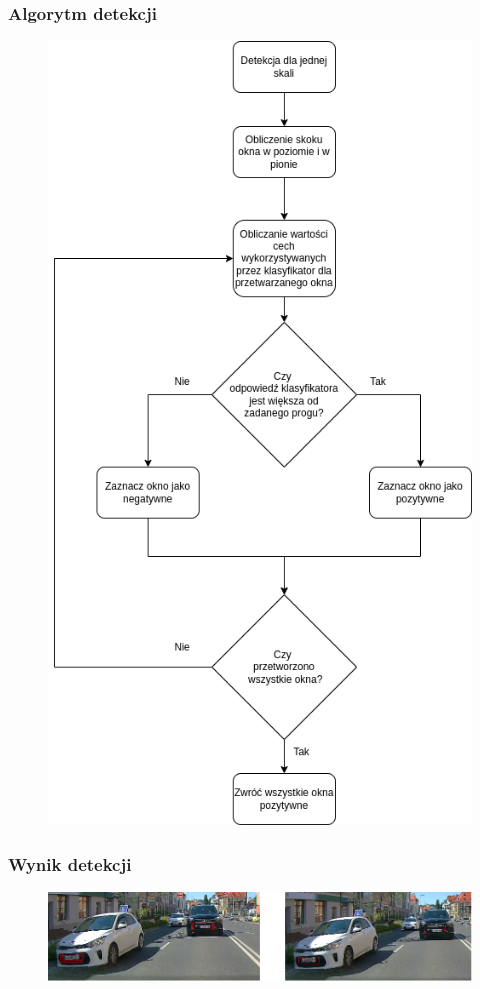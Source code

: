 \documentclass{beamer}
\begin{document}
    \begin{frame}
        \frametitle{Algorytm detekcji}
        \begin{figure}
            \includegraphics[scale=0.2]{../WIZUT-Dyplom-styl/Pictures/detection_alg}
        \end{figure}
    \end{frame}

    \begin{frame}
        \frametitle{Wynik detekcji}
        \begin{figure}
            \includegraphics[scale=0.3]{../WIZUT-Dyplom-styl/Pictures/non_max_supression}
        \end{figure}
    \end{frame}
\end{document}
